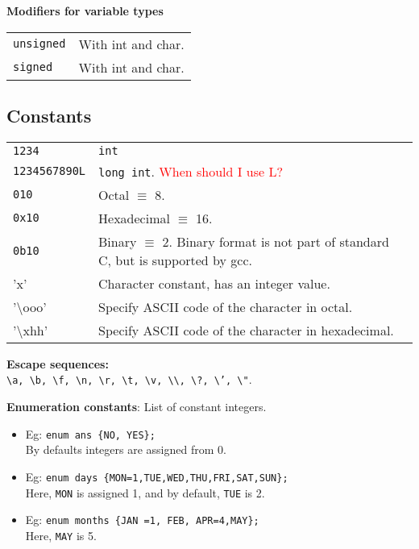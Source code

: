 \textbf{Modifiers for variable types}
\begin{tabularx}{\linewidth}{lX}
\texttt{unsigned} & With int and char.\\
\texttt{signed} & With int and char.\\
\end{tabularx}


\subsection{Constants}

\begin{tabularx}{\linewidth}{lX}
\texttt{1234} & \texttt{int}\\
\texttt{1234567890L} & \texttt{long int}. \textcolor{red}{When should I use L?}\\
\texttt{010} & Octal $\equiv$ 8.\\
\texttt{0x10} & Hexadecimal $\equiv$ 16.\\
\texttt{0b10} & Binary $\equiv$ 2. Binary format is not part of standard C, but is supported by gcc.\\
'x' & Character constant, has an integer value.\\
'\textbackslash ooo' & Specify ASCII code of the character in octal.\\
'\textbackslash xhh' & Specify ASCII code of the character in hexadecimal.\\
\end{tabularx}

\textbf{Escape sequences:}\\
 \texttt{\textbackslash a, \textbackslash b, \textbackslash f, \textbackslash n, \textbackslash r, \textbackslash t, \textbackslash v, \textbackslash \textbackslash, \textbackslash ?, \textbackslash ', \textbackslash "}.

\textbf{Enumeration constants}: List of constant integers.\\

\begin{itemize}
\item Eg: \texttt{enum ans \{NO, YES\};}\\
By defaults integers are assigned from 0.
\item Eg: \texttt{enum days \{MON=1,TUE,WED,THU,FRI,SAT,SUN\};}\\
Here, \texttt{MON} is assigned 1, and by default, \texttt{TUE} is 2. 
\item Eg: \texttt{enum months \{JAN =1, FEB, APR=4,MAY\};}\\
Here, \texttt{MAY} is 5.
\end{itemize}
